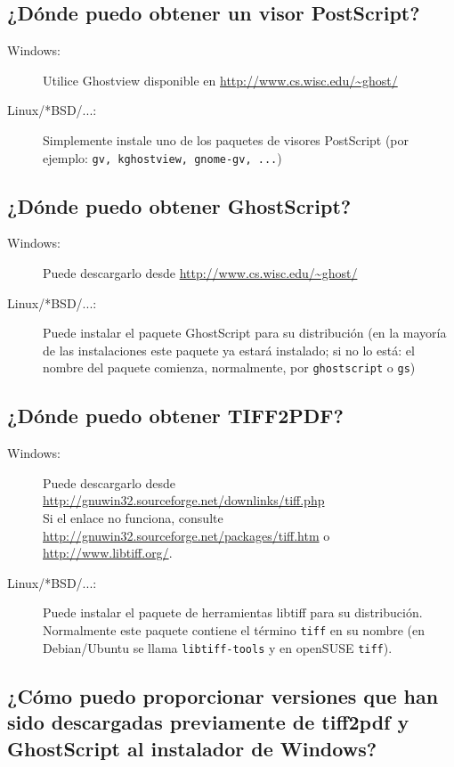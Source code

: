 \documentclass[a4paper,10pt]{scrartcl}
\begin{document}
\subsection{¿Dónde puedo obtener un visor PostScript?}
\begin{description}
\item[Windows:] Utilice Ghostview disponible en
\url{http://www.cs.wisc.edu/~ghost/}\\
\item[Linux/*BSD/...:] Simplemente instale uno de los paquetes de visores PostScript
		(por ejemplo: \texttt{gv, kghostview, gnome-gv, ...})
\end{description}


\subsection{¿Dónde puedo obtener GhostScript?}
\begin{description}
\item[Windows:] Puede descargarlo desde \url{http://www.cs.wisc.edu/~ghost/}
\item[Linux/*BSD/...:] Puede instalar el paquete GhostScript para su distribución (en la mayoría de las instalaciones este paquete ya estará instalado; si no lo está: el nombre del paquete comienza, normalmente, por \texttt{ghostscript} o \texttt{gs})
\end{description}

\subsection{¿Dónde puedo obtener TIFF2PDF?}
\begin{description}
\item[Windows:] Puede descargarlo desde \url{http://gnuwin32.sourceforge.net/downlinks/tiff.php}\\ Si el enlace no funciona, consulte \url{http://gnuwin32.sourceforge.net/packages/tiff.htm} o \url{http://www.libtiff.org/}.
\item[Linux/*BSD/...:] Puede instalar el paquete de herramientas libtiff para su distribución. Normalmente este paquete contiene el término \texttt{tiff} en su nombre (en Debian/Ubuntu se llama \texttt{libtiff-tools} y en openSUSE \texttt{tiff}).
\end{description}

\subsection{¿Cómo puedo proporcionar versiones que han sido descargadas previamente de tiff2pdf y GhostScript al instalador de Windows?}
\end{document}

